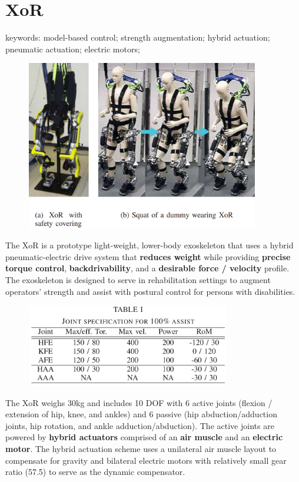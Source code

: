 \section{XoR}
\label{exo:XoR}
\begin{refsection}

keywords: model-based control; strength augmentation; hybrid actuation; pneumatic actuation; electric motors;\\

\begin{figure}[ht]
  \centering
  \includegraphics[width=4.0in]{exos/figs/xor.png}
\end{figure}

The XoR is a prototype light-weight, lower-body exoskeleton that uses a hybrid pneumatic-electric drive system that \textbf{reduces weight} while providing \textbf{precise torque control}, \textbf{backdrivability}, and a \textbf{desirable force / velocity} profile.  The exoskeleton is designed to serve in rehabilitation settings to augment operators' strength and assist with postural control for persons with disabilities.

\begin{figure}[ht]
  \centering
  \includegraphics[width=3.5in]{exos/figs/xor_joint_rom.png}
\end{figure}

The XoR weighs 30kg and includes 10 DOF with 6 active joints (flexion / extension of hip, knee, and ankles) and 6 passive (hip abduction/adduction joints, hip rotation, and ankle adduction/abduction).  The active joints are powered by \textbf{hybrid actuators} comprised of an \textbf{air muscle} and an \textbf{electric motor}.  The hybrid actuation scheme uses a unilateral air muscle layout to compensate for gravity and bilateral electric motors with relatively small gear ratio (57.5) to serve as the dynamic compensator.


\end{refsection}
